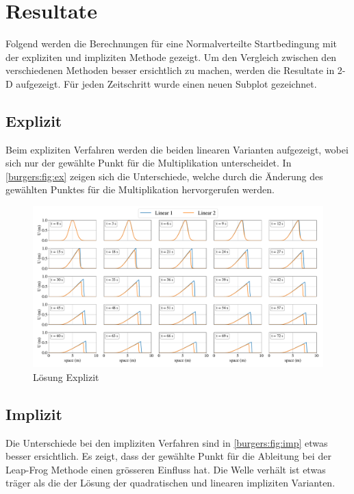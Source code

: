 %
%
\section{Resultate
\label{burgers:section:results}}

	Folgend werden die Berechnungen f\"ur eine Normalverteilte Startbedingung mit der expliziten und impliziten Methode gezeigt.
	Um den Vergleich zwischen den verschiedenen Methoden besser ersichtlich zu machen, werden die Resultate in 2-D aufgezeigt.
	F\"ur jeden Zeitschritt wurde einen neuen Subplot gezeichnet.

	\subsection{Explizit}

	Beim expliziten Verfahren werden die beiden linearen Varianten aufgezeigt,
	wobei sich nur der gew\"ahlte Punkt f\"ur die Multiplikation unterscheidet.
	In \autoref{burgers:fig:ex} zeigen sich die Unterschiede, welche durch die \"Anderung des gewählten Punktes für die Multiplikation hervorgerufen werden.


    \begin{figure}
	\centering
	\includegraphics[width=1\textwidth]{papers/burgers/BurgersEquation/lin_paper.pdf}
	\caption{L\"osung Explizit}
	\label{burgers:fig:ex}
	\end{figure}

	\subsection{Implizit}

	Die Unterschiede bei den impliziten Verfahren sind in \autoref{burgers:fig:imp} etwas besser ersichtlich.
	Es zeigt, dass der gew\"ahlte Punkt f\"ur die Ableitung bei der Leap-Frog Methode einen gr\"osseren Einfluss hat.
	Die Welle verh\"alt ist etwas tr\"ager als die der L\"osung der quadratischen und linearen impliziten Varianten.

